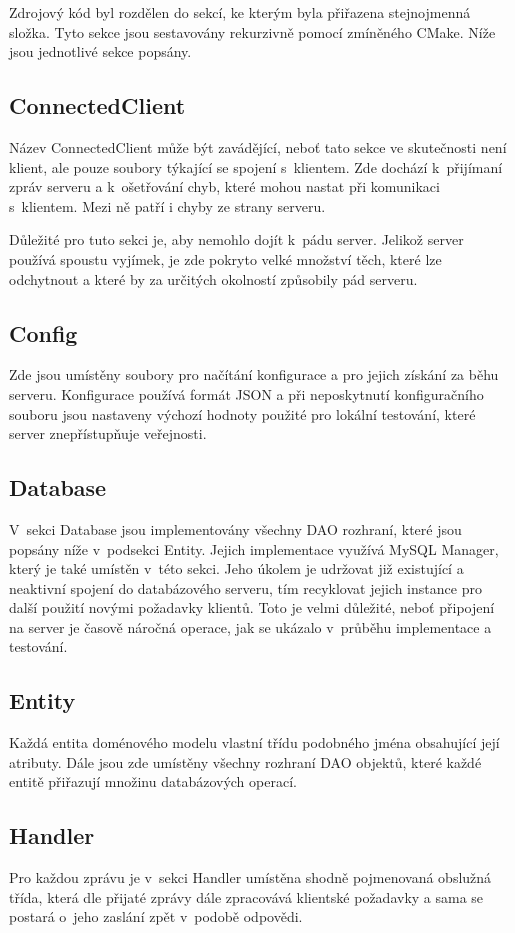 \documentclass[thesis=B,czech]{FITthesis}[2013/10/20]
\begin{document}
Zdrojový kód byl rozdělen do sekcí, ke kterým byla přiřazena stejnojmenná složka. Tyto sekce jsou sestavovány rekurzivně pomocí zmíněného CMake. Níže jsou jednotlivé sekce popsány. 

\subsection{ConnectedClient}
Název ConnectedClient může být zavádějící, neboť tato sekce ve skutečnosti není klient, ale pouze soubory týkající se spojení s~klientem. Zde dochází k~přijímaní zpráv serveru a k~ošetřování chyb, které mohou nastat při komunikaci s~klientem. Mezi ně patří i chyby ze strany serveru.

Důležité pro tuto sekci je, aby nemohlo dojít k~pádu server. Jelikož server používá spoustu vyjímek, je zde pokryto velké množství těch, které lze odchytnout a které by za určitých okolností způsobily pád serveru.

\subsection{Config}
Zde jsou umístěny soubory pro načítání konfigurace a pro jejich získání za běhu serveru. Konfigurace používá formát JSON a při neposkytnutí konfiguračního souboru jsou nastaveny výchozí hodnoty použité pro lokální testování, které server znepřístupňuje veřejnosti.

\subsection{Database}
V~sekci Database jsou implementovány všechny DAO rozhraní, které jsou popsány níže v~podsekci Entity. Jejich implementace využívá MySQL Manager, který je také umístěn v~této sekci. Jeho úkolem je udržovat již existující a neaktivní spojení do databázového serveru, tím recyklovat jejich instance pro další použití novými požadavky klientů. Toto je velmi důležité, neboť připojení na server je časově náročná operace, jak se ukázalo v~průběhu implementace a testování.

\subsection{Entity}
Každá entita doménového modelu vlastní třídu podobného jména obsahující její atributy. Dále jsou zde umístěny všechny rozhraní DAO objektů, které každé entitě přiřazují množinu databázových operací.

\subsection{Handler}
Pro každou zprávu je v~sekci Handler umístěna shodně pojmenovaná obslužná třída, která dle přijaté zprávy dále zpracovává klientské požadavky a sama se postará o~jeho zaslání zpět v~podobě odpovědi.
\end{document}

